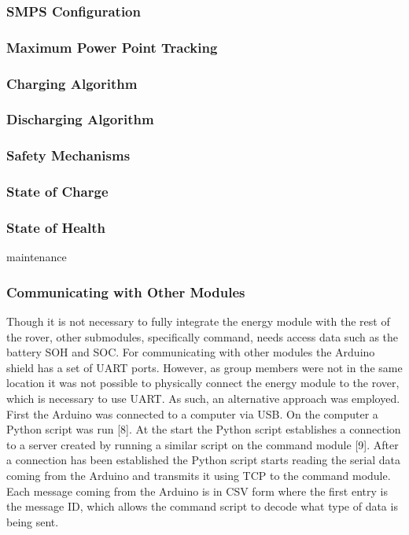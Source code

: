 \documentclass[a4paper]{article}
\begin{document}
\subsubsection{SMPS Configuration}

\subsubsection{Maximum Power Point Tracking}

\subsubsection{Charging Algorithm}

\subsubsection{Discharging Algorithm}

\subsubsection{Safety Mechanisms}

\subsubsection{State of Charge}

\subsubsection{State of Health}
maintenance

\subsubsection{Communicating with Other Modules}
Though it is not necessary to fully integrate the energy module with the rest of the rover, other submodules, specifically command, needs access data such as the battery SOH and SOC. For communicating with other modules the Arduino shield has a set of UART ports. However, as group members were not in the same location it was not possible to physically connect the energy module to the rover, which is necessary to use UART. As such, an alternative approach was employed. First the Arduino was connected to a computer via USB. On the computer a Python script was run [8]. At the start the Python script establishes a connection to a server created by running a similar script on the command module [9]. After a connection has been established the Python script starts reading the serial data coming from the Arduino and transmits it using TCP to the command module. Each message coming from the Arduino is in CSV form where the first entry is the message ID, which allows the command script to decode what type of data is being sent. 
\end{document}
